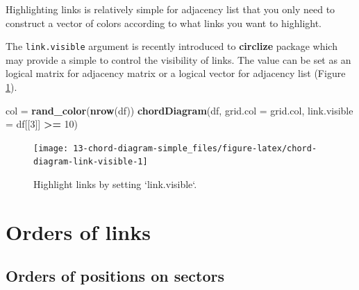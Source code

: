 \documentclass[]{book}
\newenvironment{Shaded}{\begin{snugshade}}{\end{snugshade}}
\newcommand{\KeywordTok}[1]{\textcolor[rgb]{0.13,0.29,0.53}{\textbf{#1}}}
\newcommand{\DataTypeTok}[1]{\textcolor[rgb]{0.13,0.29,0.53}{#1}}
\newcommand{\DecValTok}[1]{\textcolor[rgb]{0.00,0.00,0.81}{#1}}
\newcommand{\StringTok}[1]{\textcolor[rgb]{0.31,0.60,0.02}{#1}}
\newcommand{\OperatorTok}[1]{\textcolor[rgb]{0.81,0.36,0.00}{\textbf{#1}}}
\newcommand{\NormalTok}[1]{#1}
\theoremstyle{definition}
\theoremstyle{definition}
\theoremstyle{remark}
\begin{document}
Highlighting links is relatively simple for adjacency list that you only
need to construct a vector of colors according to what links you want to
highlight.

\begin{Shaded}
\end{Shaded}

The \texttt{link.visible} argument is recently introduced to
\textbf{circlize} package which may provide a simple to control the
visibility of links. The value can be set as an logical matrix for
adjacency matrix or a logical vector for adjacency list (Figure
\ref{fig:chord-diagram-link-visible}).

\begin{Shaded}
\begin{Highlighting}[]
\NormalTok{col =}\StringTok{ }\KeywordTok{rand_color}\NormalTok{(}\KeywordTok{nrow}\NormalTok{(df))}
\KeywordTok{chordDiagram}\NormalTok{(df, }\DataTypeTok{grid.col =}\NormalTok{ grid.col, }\DataTypeTok{link.visible =}\NormalTok{ df[[}\DecValTok{3}\NormalTok{]] }\OperatorTok{>=}\StringTok{ }\DecValTok{10}\NormalTok{)}
\end{Highlighting}
\end{Shaded}

\begin{figure}

{\centering \texttt{[image: 13-chord-diagram-simple\_files/figure-latex/chord-diagram-link-visible-1]} 

}

\caption{Highlight links by setting `link.visible`.}\label{fig:chord-diagram-link-visible}
\end{figure}

\section{Orders of links}\label{orders-of-links}

\subsection{Orders of positions on
sectors}\label{orders-of-positions-on-sectors}
\end{document}
